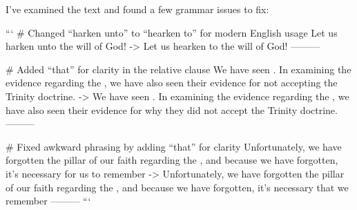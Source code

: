 I've examined the text and found a few grammar issues to fix:

```
# Changed “harken unto” to “hearken to” for modern English usage
Let us harken unto the will of God!
->
Let us hearken to the will of God!
---------

# Added “that” for clarity in the relative clause
We have seen . In examining the evidence regarding the , we have also seen their evidence for not accepting the Trinity doctrine.
->
We have seen . In examining the evidence regarding the , we have also seen their evidence for why they did not accept the Trinity doctrine.
---------

# Fixed awkward phrasing by adding “that” for clarity
Unfortunately, we have forgotten the pillar of our faith regarding the , and because we have forgotten, it's necessary for us to remember
->
Unfortunately, we have forgotten the pillar of our faith regarding the , and because we have forgotten, it's necessary that we remember
---------
```